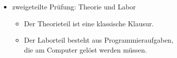 \begin{frame}
    \begin{itemize}
        \item zweigeteilte Prüfung: Theorie und Labor
        \begin{itemize}
            \item Der Theorieteil ist eine klassische Klausur.
            \item Der Laborteil besteht aus Programmieraufgaben,\\
                  die am Computer gelöst werden müssen.
        \end{itemize}
    \end{itemize}
\end{frame}